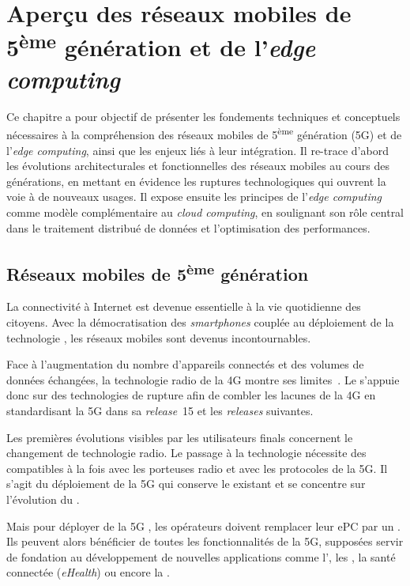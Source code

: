 \documentclass[../main.tex]{subfiles}
\begin{document}
\initSubfile[1]
\chapter{Aperçu des réseaux mobiles de 5\textsuperscript{ème} génération et de l'\textit{edge computing}}
\label{ch:overview-5G-edge}
\begin{chapterHeader}
Ce chapitre a pour objectif de présenter les fondements techniques et conceptuels nécessaires à la compréhension des réseaux mobiles de 5\textsuperscript{ème} génération (5G) et de l’\textit{edge computing}, ainsi que les enjeux liés à leur intégration. Il re-trace d’abord les évolutions architecturales et fonctionnelles des réseaux mobiles au cours des générations, en mettant en évidence les ruptures technologiques qui ouvrent la voie à de nouveaux usages. Il expose ensuite les principes de l’\textit{edge computing} comme modèle complémentaire au \textit{cloud computing}, en soulignant son rôle central dans le traitement distribué de données et l’optimisation des performances.
\end{chapterHeader}

\section{Réseaux mobiles de 5\textsuperscript{ème} génération}
La connectivité à Internet est devenue essentielle à la vie quotidienne des citoyens.
Avec la démocratisation des \textit{smartphones} couplée au déploiement de la technologie , les réseaux mobiles sont devenus incontournables.

Face à l’augmentation du nombre d’appareils connectés et des volumes de données échangées, la technologie radio de la 4G montre ses limites~\cite{10.1007/s11276-020-02479-w,10.1016/j.array.2022.100170}. Le  s’appuie donc sur des technologies de rupture afin de combler les lacunes de la 4G en standardisant la 5G dans sa \textit{release}~15 et les \textit{releases} suivantes.

Les premières évolutions visibles par les utilisateurs finals concernent le changement de technologie radio. Le passage à la technologie  nécessite des  compatibles à la fois avec les porteuses radio et avec les protocoles de la 5G. Il s’agit du déploiement de la 5G  qui conserve le  existant et se concentre sur l’évolution du .

Mais pour déployer de la 5G , les opérateurs doivent remplacer leur ePC par un . Ils peuvent alors bénéficier de toutes les fonctionnalités de la 5G, supposées servir de fondation au développement de nouvelles applications comme l’, les , la santé connectée (\textit{eHealth}) ou encore la .
\end{document}
